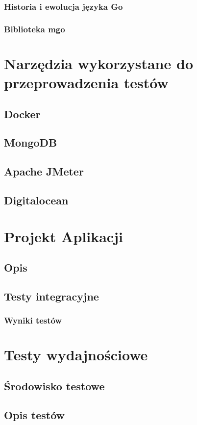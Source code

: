 \documentclass[a4paper,12pt,twoside,openany]{report}
\begin{document}
\subsection{Historia i ewolucja języka Go}
\subsection{Biblioteka mgo}

\chapter{Narzędzia wykorzystane do przeprowadzenia testów}
\section{Docker}
\section{MongoDB}
\section{Apache JMeter}
\section{Digitalocean}

\chapter{Projekt Aplikacji}
\section{Opis}
\section{Testy integracyjne}
\subsection{Wyniki testów}

\chapter{Testy wydajnościowe}
\section{Środowisko testowe}
\section{Opis testów}
\end{document}
